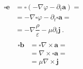 \documentclass[letterpaper,10pt,italian]{jupyterBook}
\begin{document}
\sphinxAtStartPar
{}
\begin{equation*}
\begin{split}\begin{aligned}
\square \mathbf{e} & = \square ( -\nabla \varphi - \partial_t \mathbf{a}) = \\
& = - \nabla \square \varphi - \partial_t \square \mathbf{a} = \\
& = - \nabla \dfrac{\rho}{\varepsilon} - \mu \partial_t \mathbf{j}  \ .
\end{aligned}\end{split}
\end{equation*}
\sphinxAtStartPar
{}
\begin{equation*}
\begin{split}\begin{aligned}
 \square \mathbf{b} & = \square \nabla \times \mathbf{a} = \\
 & = \nabla \times \square \mathbf{a} = \\
 & = \mu \nabla \times \mathbf{j}
\end{aligned}\end{split}
\end{equation*}
\sphinxstepscope
\end{document}
